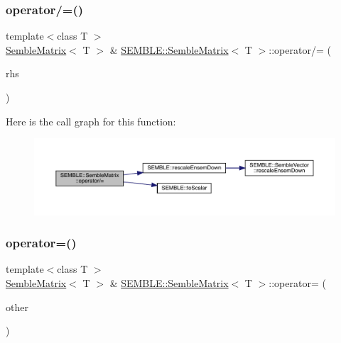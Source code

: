 \mbox{\label{structSEMBLE_1_1SembleMatrix_a3af162e4847faabe6206811309d9ed8e}} 
\subsubsection{\texorpdfstring{operator/=()}{operator/=()}\hspace{0.1cm}{\footnotesize\ttfamily [6/6]}}
{\footnotesize\ttfamily template$<$class T $>$ \\
\mbox{\hyperlink{structSEMBLE_1_1SembleMatrix}{Semble\+Matrix}}$<$ T $>$ \& \mbox{\hyperlink{structSEMBLE_1_1SembleMatrix}{S\+E\+M\+B\+L\+E\+::\+Semble\+Matrix}}$<$ T $>$\+::operator/= (\begin{DoxyParamCaption}\item[{const typename \mbox{\hyperlink{structSEMBLE_1_1PromoteEnsem}{Promote\+Ensem}}$<$ T $>$\+::Type \&}]{rhs }\end{DoxyParamCaption})}

Here is the call graph for this function\+:
\nopagebreak
\begin{figure}[H]
\begin{center}
\leavevmode
\includegraphics[width=350pt]{df/d87/structSEMBLE_1_1SembleMatrix_a3af162e4847faabe6206811309d9ed8e_cgraph}
\end{center}
\end{figure}
\mbox{\label{structSEMBLE_1_1SembleMatrix_a9ccb068428d7a8bb19cfb75ca2efbf09}} 
\subsubsection{\texorpdfstring{operator=()}{operator=()}\hspace{0.1cm}{\footnotesize\ttfamily [1/4]}}
{\footnotesize\ttfamily template$<$class T $>$ \\
\mbox{\hyperlink{structSEMBLE_1_1SembleMatrix}{Semble\+Matrix}}$<$ T $>$ \& \mbox{\hyperlink{structSEMBLE_1_1SembleMatrix}{S\+E\+M\+B\+L\+E\+::\+Semble\+Matrix}}$<$ T $>$\+::operator= (\begin{DoxyParamCaption}\item[{const \mbox{\hyperlink{structSEMBLE_1_1SembleMatrix}{Semble\+Matrix}}$<$ T $>$ \&}]{other }\end{DoxyParamCaption})}

